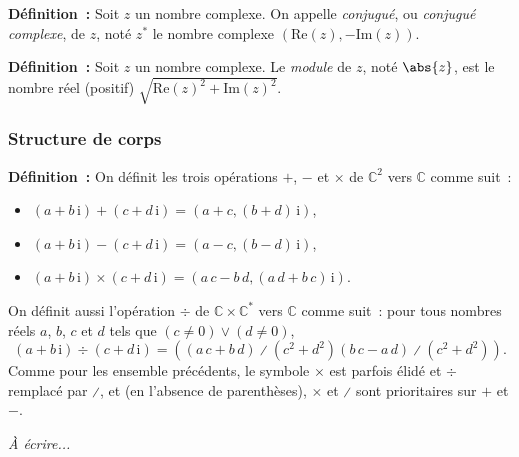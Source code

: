 \medskip

\noindent\textbf{Définition :}  \sindex[isy]{$*$}
    Soit $z$ un nombre complexe.
    On appelle \emph{conjugué}, ou \emph{conjugué complexe}, de $z$, noté $z^*$ le nombre complexe $\left( \mathrm{Re}(z), - \mathrm{Im}(z) \right)$.

\medskip

\noindent\textbf{Définition :}  \sindex[isy]{$\abs{\cdot}$}
    Soit $z$ un nombre complexe. 
    Le \emph{module} de $z$, noté $\abs{z}$, est le nombre réel (positif) $\sqrt{\mathrm{Re}(z)^2 + \mathrm{Im}(z)^2}$.

\subsubsection{Structure de corps}

\noindent\textbf{Définition :} 
    \sindex[isy]{$+$} \sindex[isy]{$-$} \sindex[isy]{$\times$} 
    On définit les trois opérations $+$, $-$ et $\times$ de $\mathbb{C}^2$ vers $\mathbb{C}$ comme suit :
    \begin{itemize}[nosep]
        \item $(a + b \, \mathrm{i}) + (c + d \, \mathrm{i}) = (a + c, (b + d) \, \mathrm{i})$,
        \item $(a + b \, \mathrm{i}) - (c + d \, \mathrm{i}) = (a - c, (b - d) \, \mathrm{i})$,
        \item $(a + b \, \mathrm{i}) \times (c + d \, \mathrm{i}) = (a \, c -  b \, d, (a \, d + b \, c) \, \mathrm{i})$.
    \end{itemize}
    \sindex[isy]{$\div$} \sindex[isy]{$\divslash$}
    On définit aussi l'opération $\div$ de $\mathbb{C} \times \mathbb{C}^*$ vers $\mathbb{C}$ comme suit : pour tous nombres réels $a$, $b$, $c$ et $d$ tels que $(c \neq 0) \vee (d \neq 0)$, 
    \begin{equation*}
        (a + b \, \mathrm{i}) \div (c + d \, \mathrm{i}) = 
        \left( 
            \left( a \, c + b \, d \right) \divslash \left( c^2 + d^2 \right)
            \left( b \, c - a \, d \right) \divslash \left( c^2 + d^2 \right)
        \right) .
    \end{equation*}
    Comme pour les ensemble précédents, le symbole $\times$ est parfois élidé et $\div$ remplacé par $\divslash$, et (en l'absence de parenthèses), $\times$ et $\divslash$ sont prioritaires sur $+$ et $-$.

\medskip

\emph{À écrire...}

